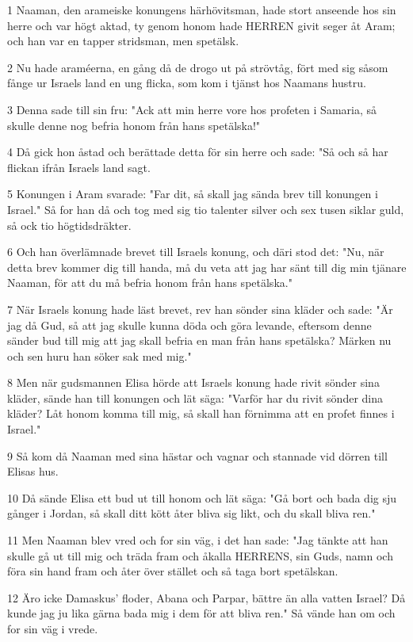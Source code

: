 \par 1 Naaman, den arameiske konungens härhövitsman, hade stort anseende hos sin herre och var högt aktad, ty genom honom hade HERREN givit seger åt Aram; och han var en tapper stridsman, men spetälsk.
\par 2 Nu hade araméerna, en gång då de drogo ut på strövtåg, fört med sig såsom fånge ur Israels land en ung flicka, som kom i tjänst hos Naamans hustru.
\par 3 Denna sade till sin fru: "Ack att min herre vore hos profeten i Samaria, så skulle denne nog befria honom från hans spetälska!"
\par 4 Då gick hon åstad och berättade detta för sin herre och sade: "Så och så har flickan ifrån Israels land sagt.
\par 5 Konungen i Aram svarade: "Far dit, så skall jag sända brev till konungen i Israel." Så for han då och tog med sig tio talenter silver och sex tusen siklar guld, så ock tio högtidsdräkter.
\par 6 Och han överlämnade brevet till Israels konung, och däri stod det: "Nu, när detta brev kommer dig till handa, må du veta att jag har sänt till dig min tjänare Naaman, för att du må befria honom från hans spetälska."
\par 7 När Israels konung hade läst brevet, rev han sönder sina kläder och sade: "Är jag då Gud, så att jag skulle kunna döda och göra levande, eftersom denne sänder bud till mig att jag skall befria en man från hans spetälska? Märken nu och sen huru han söker sak med mig."
\par 8 Men när gudsmannen Elisa hörde att Israels konung hade rivit sönder sina kläder, sände han till konungen och lät säga: "Varför har du rivit sönder dina kläder? Låt honom komma till mig, så skall han förnimma att en profet finnes i Israel."
\par 9 Så kom då Naaman med sina hästar och vagnar och stannade vid dörren till Elisas hus.
\par 10 Då sände Elisa ett bud ut till honom och lät säga: "Gå bort och bada dig sju gånger i Jordan, så skall ditt kött åter bliva sig likt, och du skall bliva ren."
\par 11 Men Naaman blev vred och for sin väg, i det han sade: "Jag tänkte att han skulle gå ut till mig och träda fram och åkalla HERRENS, sin Guds, namn och föra sin hand fram och åter över stället och så taga bort spetälskan.
\par 12 Äro icke Damaskus' floder, Abana och Parpar, bättre än alla vatten Israel? Då kunde jag ju lika gärna bada mig i dem för att bliva ren." Så vände han om och for sin väg i vrede.
